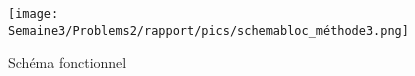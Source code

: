 \begin{figure}[htb]
    \centering
    \texttt{[image: Semaine3/Problems2/rapport/pics/schemabloc\_méthode3.png]}
    \caption{Schéma fonctionnel}
    \label{fig:Schéma_Fonctionnel_3}
\end{figure}